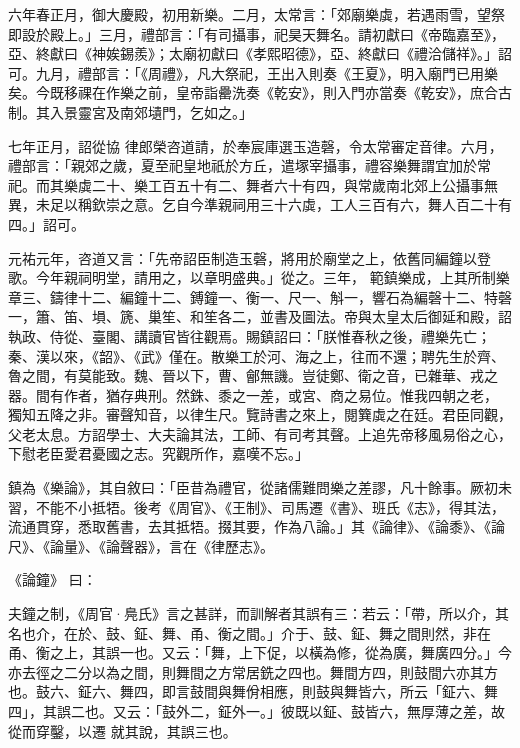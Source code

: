 \begin{pinyinscope}
 六年春正月，御大慶殿，初用新樂。二月，太常言：「郊廟樂虡，若遇雨雪，望祭即設於殿上。」三月，禮部言：「有司攝事，祀昊天舞名。請初獻曰《帝臨嘉至》，亞、終獻曰《神娭錫羨》；太廟初獻曰《孝熙昭德》，亞、終獻曰《禮洽儲祥》。」詔可。九月，禮部言：「《周禮》，凡大祭祀，王出入則奏《王夏》，明入廟門已用樂矣。今既移祼在作樂之前，皇帝詣罍洗奏《乾安》，則入門亦當奏《乾安》，庶合古制。其入景靈宮及南郊壝門，乞如之。」



 七年正月，詔從協
 律郎榮咨道請，於奉宸庫選玉造磬，令太常審定音律。六月，禮部言：「親郊之歲，夏至祀皇地祇於方丘，遣塚宰攝事，禮容樂舞謂宜加於常祀。而其樂虡二十、樂工百五十有二、舞者六十有四，與常歲南北郊上公攝事無異，未足以稱欽崇之意。乞自今準親祠用三十六虡，工人三百有六，舞人百二十有四。」詔可。



 元祐元年，咨道又言：「先帝詔臣制造玉磬，將用於廟堂之上，依舊同編鐘以登歌。今年親祠明堂，請用之，以章明盛典。」從之。三年，
 範鎮樂成，上其所制樂章三、鑄律十二、編鐘十二、鎛鐘一、衡一、尺一、斛一，響石為編磬十二、特磬一，簫、笛、塤、篪、巢笙、和笙各二，並書及圖法。帝與太皇太后御延和殿，詔執政、侍從、臺閣、講讀官皆往觀焉。賜鎮詔曰：「朕惟春秋之後，禮樂先亡；秦、漢以來，《韶》、《武》僅在。散樂工於河、海之上，往而不還；聘先生於齊、魯之間，有莫能致。魏、晉以下，曹、鄶無譏。豈徒鄭、衛之音，已雜華、戎之器。間有作者，猶存典刑。然銖、黍之一差，或宮、商之易位。惟我四朝之老，
 獨知五降之非。審聲知音，以律生尺。覽詩書之來上，閱簨虡之在廷。君臣同觀，父老太息。方詔學士、大夫論其法，工師、有司考其聲。上追先帝移風易俗之心，下慰老臣愛君憂國之志。究觀所作，嘉嘆不忘。」



 鎮為《樂論》，其自敘曰：「臣昔為禮官，從諸儒難問樂之差謬，凡十餘事。厥初未習，不能不小抵牾。後考《周官》、《王制》、司馬遷《書》、班氏《志》，得其法，流通貫穿，悉取舊書，去其抵牾。掇其要，作為八論。」其《論律》、《論黍》、《論尺》、《論量》、《論聲器》，言在《律歷志》。



 《論鐘》
 曰：



 夫鐘之制，《周官·鳧氏》言之甚詳，而訓解者其誤有三：若云：「帶，所以介，其名也介，在於、鼓、鉦、舞、甬、衡之間。」介于、鼓、鉦、舞之間則然，非在甬、衡之上，其誤一也。又云：「舞，上下促，以橫為修，從為廣，舞廣四分。」今亦去徑之二分以為之間，則舞間之方常居銑之四也。舞間方四，則鼓間六亦其方也。鼓六、鉦六、舞四，即言鼓間與舞佾相應，則鼓與舞皆六，所云「鉦六、舞四」，其誤二也。又云：「鼓外二，鉦外一。」彼既以鉦、鼓皆六，無厚薄之差，故從而穿鑿，以遷
 就其說，其誤三也。




\end{pinyinscope}
